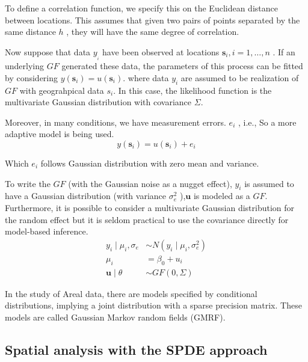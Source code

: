 \documentclass{mcmthesis}
\begin{document}
To define a correlation function, we specify this on the Euclidean distance between locations. This assumes that given two pairs of points separated by the same distance  $h$ , they will have the same degree of correlation.

Now suppose that  data  $y__{i}$ have been observed at locations  $\mathbf{s}_{i}, i=1, \ldots, n$ . If an underlying $GF$ generated these data, the parameters of this process can be fitted by considering  $y\left(\mathbf{s}_{i}\right)=u\left(\mathbf{s}_{i}\right)$. where data $y_{i}$ are assumed to be realization of  $GF$ with geograhpical data $s_{i}$. In this case, the likelihood function is the multivariate Gaussian distribution with covariance  $\Sigma$.

Moreover, in many conditions, we have measurement errors. $e_{i}$ , i.e., So a more adaptive model is being used.
\begin{equation}
    y\left(\mathbf{s}_{i}\right)=u\left(\mathbf{s}_{i}\right)+e_{i}
\end{equation}

Which $e_{i}$ follows Gaussian distribution with zero mean and variance.



To write the $GF$ (with the Gaussian noise as a nugget effect), $y_{i}$  is assumed to have a Gaussian distribution (with variance  $\sigma_{e}^{2}$  ),$\mathbf{u}$  is modeled as a $GF$. Furthermore, it is possible to consider a multivariate Gaussian distribution for the random effect but it is seldom practical to use the covariance directly for model-based inference.
\begin{equation}
\begin{aligned}
y_{i} \mid \mu_{i}, \sigma_{e} & \sim N\left(y_{i} \mid \mu_{i}, \sigma_{e}^{2}\right) \\
\mu_{i} & =\beta_{0}+u_{i} \\
\mathbf{u} \mid \theta & \sim G F(0, \Sigma)
\end{aligned}
\end{equation}

In the study of Areal data, there are models specified by conditional distributions, implying a joint distribution with a sparse precision matrix. These models are called Gaussian Markov random fields (GMRF).

\subsection{Spatial analysis with the SPDE approach}
\end{document}
